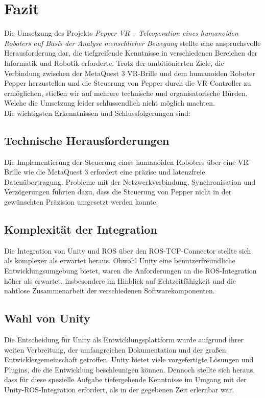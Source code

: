 \chapter{Fazit}

Die Umsetzung des Projekts \textit{Pepper VR – Teleoperation eines humanoiden Roboters auf Basis der Analyse menschlicher Bewegung} stellte eine anspruchsvolle Herausforderung dar, die tiefgreifende Kenntnisse in verschiedenen Bereichen der Informatik und Robotik erforderte. Trotz der ambitionierten Ziele, die Verbindung zwischen der MetaQuest 3 VR-Brille und dem humanoiden Roboter Pepper herzustellen und die Steuerung von Pepper durch die VR-Controller zu ermöglichen, stießen wir auf mehrere technische und organisatorische Hürden. Welche die Umsetzung leider schlussendlich nicht möglich machten.
\\

\noindent
Die wichtigsten Erkenntnissen und Schlussfolgerungen sind:

\section{Technische Herausforderungen}
Die Implementierung der Steuerung eines humanoiden Roboters über eine VR-Brille wie die MetaQuest 3 erfordert eine präzise und latenzfreie Datenübertragung. Probleme mit der Netzwerkverbindung, Synchronisation und Verzögerungen führten dazu, dass die Steuerung von Pepper nicht in der gewünschten Präzision umgesetzt werden konnte.

\section{Komplexität der Integration}
Die Integration von Unity und ROS über den ROS-TCP-Connector stellte sich als komplexer als erwartet heraus. Obwohl Unity eine benutzerfreundliche Entwicklungsumgebung bietet, waren die Anforderungen an die ROS-Integration höher als erwartet, insbesondere im Hinblick auf Echtzeitfähigkeit und die nahtlose Zusammenarbeit der verschiedenen Softwarekomponenten.

\section{Wahl von Unity}
Die Entscheidung für Unity als Entwicklungsplattform wurde aufgrund ihrer weiten Verbreitung, der umfangreichen Dokumentation und der großen Entwicklergemeinschaft getroffen. Unity bietet viele vorgefertigte Lösungen und Plugins, die die Entwicklung beschleunigen können. Dennoch stellte sich heraus, dass für diese spezielle Aufgabe tiefergehende Kenntnisse im Umgang mit der Unity-ROS-Integration erfordert, als in der gegebenen Zeit erlernbar war.

